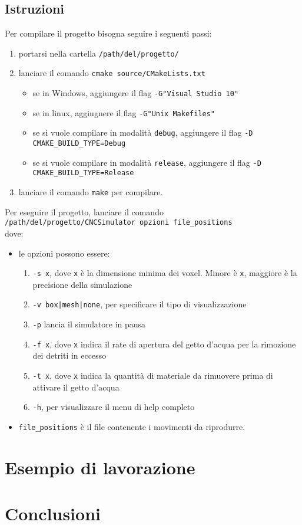 \documentclass[11pt,a4paper,twoside,openright,titlepage,fleqn,%
               headinclude,,footinclude,BCOR5mm,%
               numbers=noenddot,cleardoublepage=empty,%
               tablecaptionabove]{scrreprt}
\begin{document}
\subsection{Istruzioni}
Per compilare il progetto bisogna seguire i seguenti passi:
\begin{enumerate}
  \item portarsi nella cartella \verb!/path/del/progetto/!
  \item lanciare il comando \verb!cmake source/CMakeLists.txt!
    \begin{itemize}[noitemsep]
      \item se in Windows, aggiungere il flag \verb!-G"Visual Studio 10"!
      \item se in linux, aggiugnere il flag \verb!-G"Unix Makefiles"!
    \end{itemize}
    \begin{itemize}[noitemsep]
      \item se si vuole compilare in modalità \verb!debug!, aggiungere il flag \verb!-D CMAKE_BUILD_TYPE=Debug!
      \item se si vuole compilare in modalità \verb!release!, aggiungere il flag \verb!-D CMAKE_BUILD_TYPE=Release!
    \end{itemize}
  \item lanciare il comando \verb!make! per compilare.
\end{enumerate}

Per eseguire il progetto, lanciare il comando\\ \verb!/path/del/progetto/CNCSimulator opzioni file_positions!\\ dove:
\begin{itemize}
  \item le opzioni possono essere:
    \begin{enumerate}[noitemsep]
      \item \verb!-s x!, dove \verb!x! è la dimensione minima dei voxel. Minore è \verb!x!, maggiore è la precisione della simulazione
      \item \verb!-v box|mesh|none!, per specificare il tipo di visualizzazione
      \item \verb!-p! lancia il simulatore in pausa
      \item \verb!-f x!, dove \verb!x! indica il rate di apertura del getto d'acqua per la rimozione dei detriti in eccesso
      \item \verb!-t x!, dove \verb!x! indica la quantità di materiale da rimuovere prima di attivare il getto d'acqua
      \item \verb!-h!, per visualizzare il menu di help completo
    \end{enumerate}
  \item \verb!file_positions! è il file contenente i movimenti da riprodurre.
\end{itemize}

\section{Esempio di lavorazione}

\section{Conclusioni}
\end{document}

